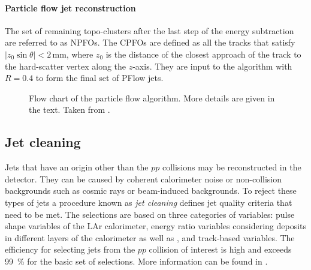 \paragraph{Particle flow jet reconstruction}
The set of remaining topo-clusters after the last step of the energy subtraction are referred to as NPFOs. The CPFOs are defined as all the tracks that satisfy $|z_0 \sin \theta| < 2$\,mm, where $z_0$ is the distance of the closest approach of the track to the hard-scatter vertex along the $z$-axis.
They are input to the \antikt algorithm with $R=0.4$ to form the final set of PFlow jets.

\FloatBarrier
\begin{figure}[t]
    \caption{Flow chart of the particle flow algorithm. More details are given in the text. Taken from .}
    \label{fig:pflow-algorithm}
\end{figure}


\subsection{Jet cleaning}
Jets that have an origin other than the $pp$ collisions may be reconstructed in the detector. They can be caused by coherent calorimeter noise or non-collision backgrounds such as cosmic rays or beam-induced backgrounds. To reject these types of jets a procedure known as \emph{jet cleaning} defines jet quality criteria that need to be met. The selections are based on three categories of variables: pulse shape variables of the LAr calorimeter, energy ratio variables considering deposits in different layers of the calorimeter as well as \fEM, and track-based variables. The efficiency for selecting jets from the $pp$ collision of interest is high and exceeds \SI{99}{\percent} for the basic set of selections. More information can be found in .


